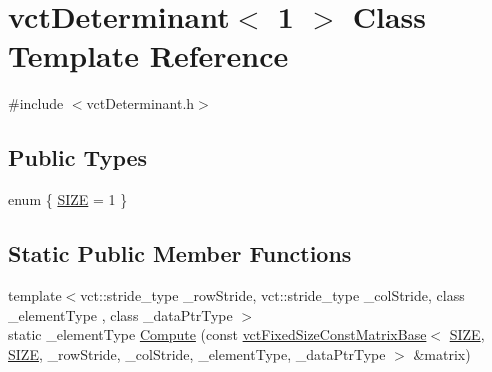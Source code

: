 \hypertarget{classvct_determinant_3_011_01_4}{}\section{vct\+Determinant$<$ 1 $>$ Class Template Reference}
\label{classvct_determinant_3_011_01_4}


{\ttfamily \#include $<$vct\+Determinant.\+h$>$}

\subsection*{Public Types}
\begin{DoxyCompactItemize}
\item 
enum \{ \hyperlink{classvct_determinant_3_011_01_4_ae73865b91d79204caa787acd03c99885a105e61510b1504060ff5d4bf5e35f8f9}{S\+I\+Z\+E} = 1
 \}
\end{DoxyCompactItemize}
\subsection*{Static Public Member Functions}
\begin{DoxyCompactItemize}
\item 
{\footnotesize template$<$vct\+::stride\+\_\+type \+\_\+row\+Stride, vct\+::stride\+\_\+type \+\_\+col\+Stride, class \+\_\+element\+Type , class \+\_\+data\+Ptr\+Type $>$ }\\static \+\_\+element\+Type \hyperlink{classvct_determinant_3_011_01_4_a6406b6e1406b14ea280cc5dec6d2ad99}{Compute} (const \hyperlink{classvct_fixed_size_const_matrix_base}{vct\+Fixed\+Size\+Const\+Matrix\+Base}$<$ \hyperlink{classvct_determinant_3_011_01_4_ae73865b91d79204caa787acd03c99885a105e61510b1504060ff5d4bf5e35f8f9}{S\+I\+Z\+E}, \hyperlink{classvct_determinant_3_011_01_4_ae73865b91d79204caa787acd03c99885a105e61510b1504060ff5d4bf5e35f8f9}{S\+I\+Z\+E}, \+\_\+row\+Stride, \+\_\+col\+Stride, \+\_\+element\+Type, \+\_\+data\+Ptr\+Type $>$ \&matrix)
\end{DoxyCompactItemize}


